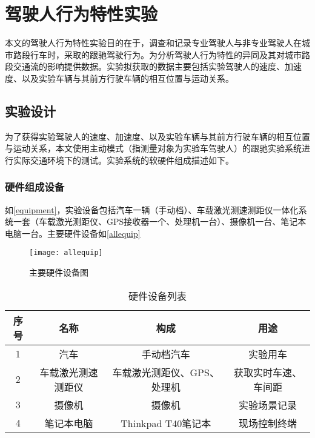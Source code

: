 \chapter{驾驶人行为特性实验}



本文的驾驶人行为特性实验目的在于，调查和记录专业驾驶人与非专业驾驶人在城市路段行车时，采取的跟驰驾驶行为。为分析驾驶人行为特性的异同及其对城市路段交通流的影响提供数据。实验拟获取的数据主要包括实验驾驶人的速度、加速度、以及实验车辆与其前方行驶车辆的相互位置与运动关系。



\section{实验设计}
为了获得实验驾驶人的速度、加速度、以及实验车辆与其前方行驶车辆的相互位置与运动关系，本文使用主动模式（指测量对象为实验车驾驶人）的跟驰实验系统进行实际交通环境下的测试。实验系统的软硬件组成描述如下。
\subsection{硬件组成设备}
如\autoref{equipment}，实验设备包括汽车一辆（手动档）、车载激光测速测距仪一体化系统一套（车载激光测距仪、GPS接收器一个、处理机一台）、摄像机一台、笔记本电脑一台。主要硬件设备如\autoref{allequip}

\begin{figure}[htpb]
\centering
\texttt{[image: allequip]}
\caption{主要硬件设备图}
\label{allequip}
\end{figure}

\begin{table}[htbp]
 \centering
 \caption{硬件设备列表}
 \begin{tabular}{cccc}
   \addlinespace
    \toprule
    序号 & 名称  & 构成 & 用途 \\
    \midrule
	1 & 汽车 & 手动档汽车 & 实验用车 \\
	2 & 车载激光测速测距仪 & 车载激光测距仪、GPS、处理机 & 获取实时车速、车间距 \\
	3 & 摄像机 & 摄像机 & 实验场景记录 \\
	4 & 笔记本电脑 & Thinkpad T40笔记本 & 现场控制终端 \\
    \bottomrule
    \end{tabular}
  \label{equipment}
\end{table}



